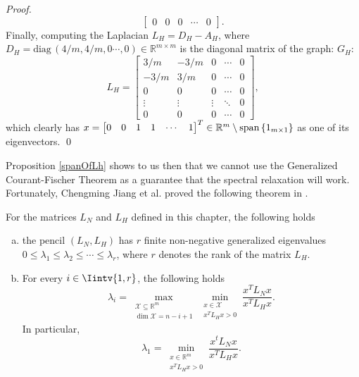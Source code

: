 \begin{proof}
\begin{equation*}
\begin{bmatrix}
         0 & 0 & 0 & \cdots & 0 
      \end{bmatrix}.
   \end{equation*}
   Finally, computing the Laplacian $L_H = D_H - A_H$, where $D_H = \text{diag} \,(4/m, 4/m, 0 \cdots, 0) \in \mathbb R^{m \times m}$ is the diagonal matrix of the graph:
   $G_H$:
   \begin{equation*}
      L_H =
      \begin{bmatrix}
         3/m & -3/m & 0 & \cdots & 0 \\
         -3/m & 3/m & 0 & \cdots & 0 \\
         0 & 0 & 0 & \cdots & 0 \\
         \vdots & \vdots & \vdots & \ddots & 0 \\
         0 & 0 & 0 & \cdots & 0 
      \end{bmatrix},
   \end{equation*}
   which clearly has $x = {\begin{bmatrix} 0 & 0 & 1 & 1 & \cdots & 1 \end{bmatrix}}^T \in \mathbb R ^{m} \setminus \operatorname{span\,} \{ 1_{m \times 1} \}$ as one of its eigenvectors. \qed
\end{proof}

Proposition \vref{spanOfLh} shows to us then that we cannot use the Generalized Courant-Fischer Theorem as a guarantee that the spectral relaxation will work.
Fortunately, Chengming Jiang et al. proved the following theorem in \cite{fastge2}.

\begin{theorem}
   \label{fastge2theorem}
   For the matrices $L_N$ and $L_H$ defined in this chapter, the following holds
   \begin{enumerate}[(a)]
      \item the pencil $(L_N, L_H)$ has $r$ finite non-negative generalized eigenvalues $0 \le \lambda_1 \le \lambda_2 \le \cdots \le \lambda_r$, where $r$ denotes the rank of the matrix $L_H$.
      \item For every $i \in \Iintv{1,r}$, the following holds
         \begin{equation}
            \lambda_i = \max_{\substack{\mathcal X \subseteq \mathbb R^m \\ \dim {\mathcal X} = n-i+1 }} \min_{\substack{x \in \mathcal X \\ x^T L_H x > 0}} \frac{x^T L_N x}{x^T L_H x}.
         \end{equation}
         In particular, 
         \begin{equation}
            \lambda_1 = \min_{\substack{x \in \mathbb R^m \\ x^TL_Hx>0}} \frac{x^tL_N x}{x^T L_H x}.
         \end{equation}
   \end{enumerate}
\end{theorem}

